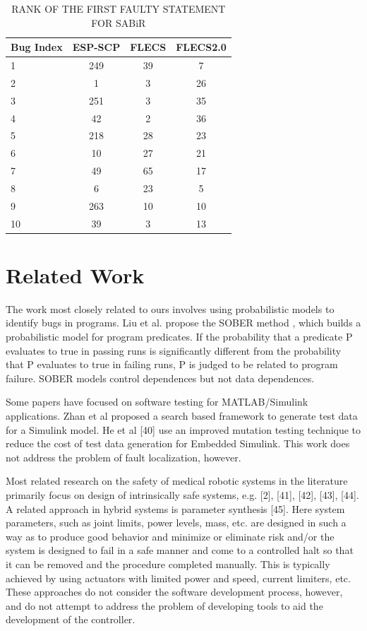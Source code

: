 \begin{table}[htbp!]
\centering
\caption{RANK OF THE FIRST FAULTY STATEMENT FOR SABiR}
\label{flsabir}
      \begin{tabular}{|l|c|c|c|}
      \hline
Bug Index	&	ESP-SCP	&	FLECS	&	FLECS2.0	\\ \hline
1	&	249	&	39	&	7	\\ \hline
2	&	1	&	3	&	26	\\ \hline
3	&	251	&	3	&	35	\\ \hline
4	&	42	&	2	&	36	\\ \hline
5	&	218	&	28	&	23	\\ \hline
6	&	10	&	27	&	21	\\ \hline
7	&	49	&	65	&	17	\\ \hline
8	&	6	&	23	&	5	\\ \hline
9	&	263	&	10	&	10	\\ \hline
10	&	39	&	3	&	13	\\ \hline
\end{tabular}
\end{table}

\section{Related Work}
The work most closely related to ours involves using probabilistic models to identify bugs in programs. Liu et al. propose the SOBER method \cite{}, which builds a probabilistic model for program predicates. If the probability that a predicate P evaluates to true in passing runs is significantly different from the probability that P evaluates to true in failing runs, P is judged to be related to program failure. SOBER models control dependences but not data dependences. 

Some papers have focused on software testing for MATLAB/Simulink applications. Zhan et al \cite{} proposed a search based framework to generate test data for a Simulink model. He et al [40] use an improved mutation testing technique to reduce the cost of test data generation for Embedded Simulink. This work does not address the problem of fault localization, however.

Most related research on the safety of medical robotic systems in the literature primarily focus on design of intrinsically safe systems, e.g. [2], [41], [42], [43], [44]. A related approach in hybrid systems is parameter synthesis [45]. Here system parameters, such as joint limits, power levels, mass, etc. are designed in such a way as to produce good behavior and minimize or eliminate risk and/or the system is designed to fail in a safe manner and come to a controlled halt so that it can be removed and the procedure completed manually. This is typically achieved by using actuators with limited power and speed, current limiters, etc. These approaches do not consider the software development process, however, and do not attempt to address the problem of developing tools to aid the development of the controller.

